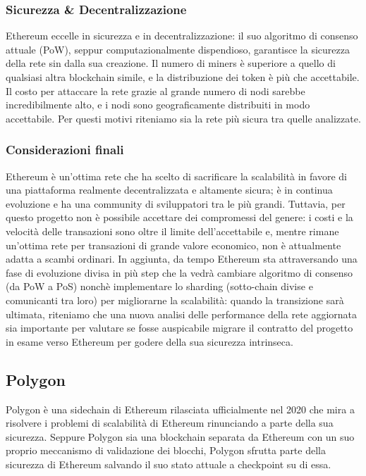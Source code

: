 \documentclass[a4paper, 12pt]{article}
\begin{document}
\subsubsection*{Sicurezza \& Decentralizzazione}
Ethereum eccelle in sicurezza e in decentralizzazione: il suo algoritmo di consenso attuale (PoW), seppur computazionalmente dispendioso, garantisce la sicurezza della rete sin dalla sua creazione. Il numero di miners è superiore a quello di qualsiasi altra blockchain simile, e la distribuzione dei token è più che accettabile.
Il costo per attaccare la rete grazie al grande numero di nodi sarebbe incredibilmente alto, e i nodi sono geograficamente distribuiti in modo accettabile.
Per questi motivi riteniamo sia la rete più sicura tra quelle analizzate.

\subsubsection*{Considerazioni finali}
Ethereum è un'ottima rete che ha scelto di sacrificare la scalabilità in favore di una piattaforma realmente decentralizzata e altamente sicura; è in continua evoluzione
e ha una community di sviluppatori tra le più grandi. Tuttavia, per questo progetto non è possibile accettare dei compromessi del genere: i costi e la velocità delle transazioni
sono oltre il limite dell'accettabile e, mentre rimane un'ottima rete per transazioni di grande valore economico, non è attualmente adatta a scambi ordinari.
In aggiunta, da tempo Ethereum sta attraversando una fase di evoluzione divisa in più step che la vedrà cambiare algoritmo di consenso (da PoW a PoS) nonchè implementare
lo sharding (sotto-chain divise e comunicanti tra loro) per migliorarne la scalabilità: quando la transizione sarà ultimata, riteniamo che una nuova analisi delle performance
della rete aggiornata sia importante per valutare se fosse auspicabile migrare il contratto del progetto in esame verso Ethereum per godere della sua sicurezza intrinseca.

\newpage

\subsection*{Polygon}
Polygon è una sidechain di Ethereum rilasciata ufficialmente nel 2020 che mira a risolvere i problemi di scalabilità di Ethereum rinunciando a parte della sua sicurezza.
Seppure Polygon sia una blockchain separata da Ethereum con un suo proprio meccanismo di validazione dei blocchi, Polygon sfrutta parte della sicurezza di Ethereum salvando il suo stato attuale a checkpoint su di essa.
\end{document}
